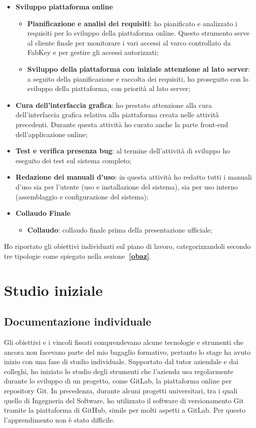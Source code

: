 \begin{itemize}
\item \textbf{Sviluppo piattaforma online}
\begin{itemize}
	\item \textbf{Pianificazione e analisi dei requisiti}: ho pianificato e analizzato i requisiti per lo sviluppo della piattaforma online. Questo strumento serve al cliente finale per monitorare i vari accessi al varco controllato da FabKey e per gestire gli accessi autorizzati;
	\item \textbf{Sviluppo della piattaforma con iniziale attenzione al lato server}: a seguito della pianificazione e raccolta dei requisiti, ho proseguito con lo sviluppo della piattaforma, con priorità al lato server;
\end{itemize}

\item \textbf{Cura dell'interfaccia grafica}: ho prestato attenzione alla cura dell'interfaccia grafica relativa alla piattaforma creata nelle attività precedenti. Durante questa attività ho curato anche la parte front-end dell'applicazione online;
\item \textbf{Test e verifica presenza bug}: al termine dell'attività di sviluppo ho eseguito dei test sul sistema completo;
\item \textbf{Redazione dei manuali d’uso}: in questa attività ho redatto tutti i manuali d'uso sia per l'utente (uso e installazione del sistema), sia per uso interno (assemblaggio e configurazione del sistema);

\item \textbf{Collaudo Finale}
\begin{itemize}
	\item \textbf{Collaudo}: collaudo finale prima della presentazione ufficiale;
\end{itemize}
\end{itemize}

\medskip

Ho riportato gli obiettivi individuati sul piano di lavoro, categorizzandoli secondo tre tipologie come spiegato nella sezione\textbf{~\ref{obaz}}.


\section{Studio iniziale}
\subsection{Documentazione individuale}
Gli obiettivi e i vincoli fissati comprendevano alcune tecnologie e strumenti che ancora non facevano parte del mio bagaglio formativo, pertanto lo stage ha avuto inizio con una fase di studio individuale.
Supportato dal tutor aziendale e dai colleghi, ho iniziato lo studio degli strumenti che l'azienda usa regolarmente durante lo sviluppo di un progetto, come GitLab, la piattaforma online per repository Git. In precedenza, durante alcuni progetti universitari, tra i quali quello di Ingegneria del Software, ho utilizzato il software di versionamento Git tramite la piattaforma di GitHub, simile per molti aspetti a GitLab. Per questo l'apprendimento non è stato difficile.

